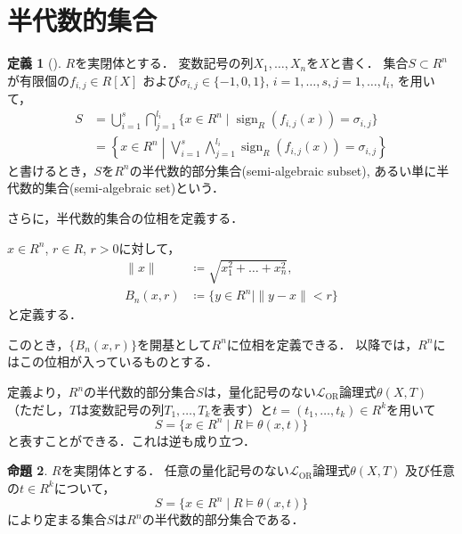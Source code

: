 \documentclass[uplatex, dvipdfmx]{jsarticle}
\numberwithin{equation}{section}
\newcommand{\norm}[1]{\| {#1} \|}
\DeclareMathOperator{\sign}{sign}
\theoremstyle{definition}
\newtheorem{definition}{定義}[section]
\newtheorem{proposition}[definition]{命題}
\begin{document}
\section{半代数的集合}\label{section:5}
\begin{definition}[{\cite[Definition 2.1.4]{MR1659509}}]
     $R$を実閉体とする．
     変数記号の列$X_1, \dots, X_n$を$X$と書く．
     集合$S \subset R^n$が有限個の$f_{i,j} \in R[X]$
     および$\sigma_{i,j} \in \{-1, 0 ,1\}$, $i=1, \dots, s, j = 1, \dots, l_i$, を用いて，
     \begin{align}
          S &= \bigcup_{i=1}^s \bigcap_{j=1}^{l_i} \{x \in R^n \mid \sign_R(f_{i,j}(x)) = \sigma_{i,j}\}\\
            &= \left\{ x \in R^n \middle| \bigvee_{i=1}^s \bigwedge_{j=1}^{l_i} \sign_R(f_{i,j}(x)) = \sigma_{i,j} \right\}
     \end{align}
     と書けるとき，$S$を$R^n$の半代数的部分集合(semi-algebraic subset), あるい単に半代数的集合(semi-algebraic set)という．
\end{definition}

さらに，半代数的集合の位相を定義する．

$x \in R^n$, $r \in R$, $r>0$に対して，
\begin{align}
     \norm{x} &\coloneqq \sqrt{x_1^2 + \dots + x_n^2},\\
     B_n(x,r) &\coloneqq \{y \in R^n \mid \norm{y-x} < r\}
\end{align}
と定義する．

このとき，$\{B_n(x,r)\}$を開基として$R^n$に位相を定義できる．
以降では，$R^n$にはこの位相が入っているものとする．

定義より，$R^n$の半代数的部分集合$S$は，量化記号のない$\mathcal{L}_\mathrm{OR}$論理式$\theta( X, T )$ 
（ただし，$T$は変数記号の列$T_1, \dots, T_k$を表す）と$t = (t_1, \dots, t_k) \in R^k$を用いて
\begin{equation}
     S = \{ x \in R^n \mid R \models \theta(x, t) \}
\end{equation}
と表すことができる．これは逆も成り立つ．

\begin{proposition} \label{proposition:semi-algebraic-set}
     $R$を実閉体とする．
     任意の量化記号のない$\mathcal{L}_\mathrm{OR}$論理式$\theta( X, T )$
     及び任意の$t \in R^k$について，
     \begin{equation}
          S = \{ x \in R^n \mid R \models \theta(x, t) \}
     \end{equation}
     により定まる集合$S$は$R^n$の半代数的部分集合である．
\end{proposition}
\end{document}
